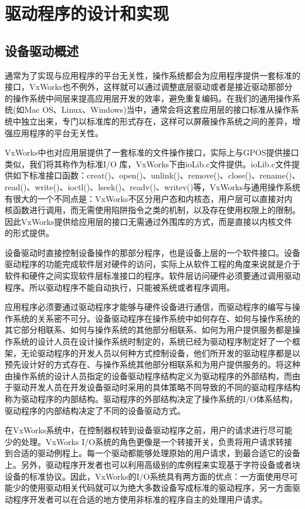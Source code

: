 \chapter{驱动程序的设计和实现}

\section{设备驱动概述}
	通常为了实现与应用程序的平台无关性，操作系统都会为应用程序提供一套标准的接口，VxWorks也不例外，这样就可以通过调整底层驱动或者是接近驱动那部分的操作系统中间层来提高应用层开发的效率，避免重复编码。在我们的通用操作系统(如Mac OS、Linux、Windows)当中，通常会将这套应用层的接口标准从操作系统中独立出来，专门以标准库的形式存在，这样可以屏蔽操作系统之间的差异，增强应用程序的平台无关性。
	
	VxWorks中也对应用层提供了一套标准的文件操作接口，实际上与GPOS提供接口类似，我们将其称作为标准I/O 库，VxWorks下由ioLib.c文件提供。ioLib.c文件提供如下标准接口函数：creat()、open()、unlink()、remove()、close()、rename()、read()、write()、ioctl()、lseek()、readv()、writev()等\cite{BSP开发人员指南}，VxWorks与通用操作系统有很大的一个不同点是：VxWorks不区分用户态和内核态，用户层可以直接对内核函数进行调用，而无需使用陷阱指令之类的机制，以及存在使用权限上的限制。因此VxWorks提供给应用层的接口无需通过外围库的方式，而是直接以内核文件的形式提供。
	
	设备驱动时直接控制设备操作的那部分程序，也是设备上层的一个软件接口。设备驱动程序的功能完成软件层对硬件的访问，实际上从软件工程的角度来说就是介于软件和硬件之间实现软件层标准接口的程序。软件层访问硬件必须要通过调用驱动程序。所以驱动程序不能自动执行，只能被系统或者程序调用。
	
	应用程序必须要通过驱动程序才能够与硬件设备进行通信，而驱动程序的编写与操作系统的关系密不可分。设备驱动程序在操作系统中如何存在、如何与操作系统的其它部分相联系、如何与操作系统的其他部分相联系、如何为用户提供服务都是操作系统的设计人员在设计操作系统时制定的，系统已经为驱动程序制定好了一个框架，无论驱动程序的开发人员以何种方式控制设备，他们所开发的驱动程序都是以预先设计好的方式存在、与操作系统其他部分相联系和为用户提供服务的。将这种由操作系统的设计人员指定的设备驱动程序结构定义为驱动程序的外部结构，而由于驱动开发人员在开发设备驱动时采用的具体策略不同导致的不同的驱动程序结构称为驱动程序的内部结构。驱动程序的外部结构决定了操作系统的I/O体系结构，驱动程序的内部结构决定了不同的设备驱动方式。

	在VxWorks系统中，在控制器权转到设备驱动程序之前，用户的请求进行尽可能少的处理。VxWorks I/O系统的角色更像是一个转接开关，负责将用户请求转接到合适的驱动例程上。每一个驱动都能够处理原始的用户请求，到最合适它的设备上。另外，驱动程序开发者也可以利用高级别的库例程来实现基于字符设备或者块设备的标准协议。因此，VxWorks的I/O系统具有两方面的优点：一方面使用尽可能少的使用驱动相关代码就可以为绝大多数设备写成标准的驱动程序，另一方面驱动程序开发者可以在合适的地方使用非标准的程序自主的处理用户请求。


